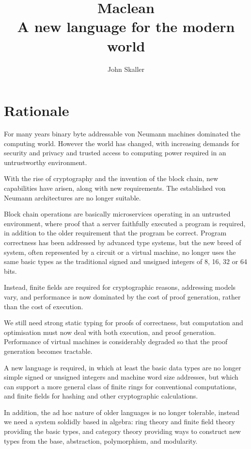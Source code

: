 \documentclass[oneside]{book}
\title{Maclean\\ A new language for the modern world}
\author{John Skaller}
\theoremstyle{plain}
\theoremstyle{definition}
\theoremstyle{plain}
\begin{document}
\maketitle
\tableofcontents
\chapter{Rationale}
For many years binary byte addressable von Neumann machines dominated the computing world.
However the world has changed, with increasing demands for security and privacy and
trusted access to computing power required in an untrustworthy environment.

With the rise of cryptography and the invention of the block chain, new capabilities
have arisen, along with new requirements. The established von Neumann architectures
are no longer suitable.

Block chain operations are basically microservices operating in an untrusted environment,
where proof that a server faithfully executed a program is required, in addition to the
older requirement that the program be correct. Program correctness has been addressed
by advanced type systems, but the new breed of system, often represented by a circuit
or a virtual machine, no longer uses the same basic types as the traditional signed
and unsigned integers of 8, 16, 32 or 64 bits.

Instead, finite fields are required for cryptographic reasons, addressing models vary,
and performance is now dominated by the cost of proof generation, rather than the
cost of execution.

We still need strong static typing for proofs of correctness, but computation and
optimisation must now deal with both execution, and proof generation. Performance
of virtual machines is considerably degraded so that the proof generation becomes
tractable.

A new language is required, in which at least the basic data types are no longer
simple signed or unsigned integers and machine word size addresses, but which
can support a more general class of finite rings for conventional computations,
and finite fields for hashing and other cryptographic calculations.

In addition, the ad hoc nature of older languages is no longer tolerable,
instead we need a system soldidly based in algebra: ring theory and finite field
theory providing the basic types, and category theory providing ways to
construct new types from the base, abstraction, polymorphism, and modularity.
\end{document}
